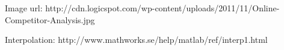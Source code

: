 \documentclass[11pt,a4paper]{article}
\title{}
\author{Malte Stær Nissen}
\begin{document}
\maketitle



Image url: http://cdn.logicspot.com/wp-content/uploads/2011/11/Online-Competitor-Analysis.jpg

Interpolation: http://www.mathworks.se/help/matlab/ref/interp1.html
\end{document}
